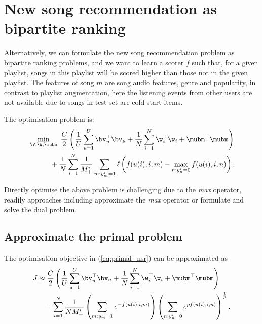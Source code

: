 \section{New song recommendation as bipartite ranking}

Alternatively, we can formulate the new song recommendation problem as bipartite ranking problems, 
and we want to learn a scorer $f$ such that, for a given playlist, 
songs in this playlist will be scored higher than those not in the given playlist.
The features of song $m$ are song audio features, genre and popularity, in contrast to playlist augmentation,
here the listening events from other users are not available due to songs in test set are cold-start items.

The optimisation problem is:
\begin{equation*}
\begin{aligned}
&\min_{\V, \W, \mubm} \ \frac{C}{2} \left( \frac{1}{U} \sum_{u=1}^U \bv_u^\top \bv_u 
     + \frac{1}{N} \sum_{i=1}^N \w_i^\top \w_i + \mubm^\top \mubm \right) \\
& \hspace{3em}
     + \frac{1}{N} \sum_{i=1}^N \frac{1}{M_+^i} \sum_{m: y_m^i = 1} \ell \left( f(u(i), i, m) - \max_{n: y_n^i = 0} f(u(i), i, n) \right).
\end{aligned}
\end{equation*}

Directly optimise the above problem is challenging due to the \emph{max} operator,
readily approaches including approximate the \emph{max} operator or formulate and solve the dual problem.


\subsection{Approximate the primal problem}
The optimisation objective in (\ref{eq:primal_nsr}) can be approximated as
\begin{equation*}
\begin{aligned}
J 
&\approx \frac{C}{2} \left( \frac{1}{U} \sum_{u=1}^U \bv_u^\top \bv_u + \frac{1}{N} \sum_{i=1}^N \w_i^\top \w_i + \mubm^\top \mubm \right) \\
& \hspace{1em}
  + \sum_{i=1}^N \frac{1}{N M_+^i} 
    \left( \sum_{m: y_m^i = 1} e^{-f(u(i), i, m)} \right)
    \left( \sum_{n: y_n^i = 0} e^{p f(u(i), i, n)} \right)^\frac{1}{p}.
\end{aligned}
\end{equation*}


